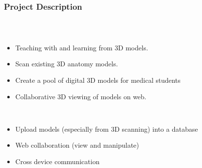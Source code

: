 \begin{frame}
  \frametitle{Project Description}
  \begin{columns}
    \begin{column}{0.8\textwidth}
      \begin{description}[]
        \item[Collaborative 3D Model Viewing] \hfill \\
        \begin{itemize}
          \item Teaching with and learning from 3D models.
          \item Scan existing 3D anatomy models.
	\item Create a pool of digital 3D models for medical students
          \item Collaborative  3D viewing of models on web.
        \end{itemize}

        \bigskip
        \item[Our Approach] \hfill \\
          \begin{itemize}
            \item Upload models (especially from 3D scanning) into a database
            \item Web collaboration (view and manipulate)
            \item Cross device communication
        \end{itemize}
      \end{description}
    \end{column}


\end{columns}
\end{frame}
